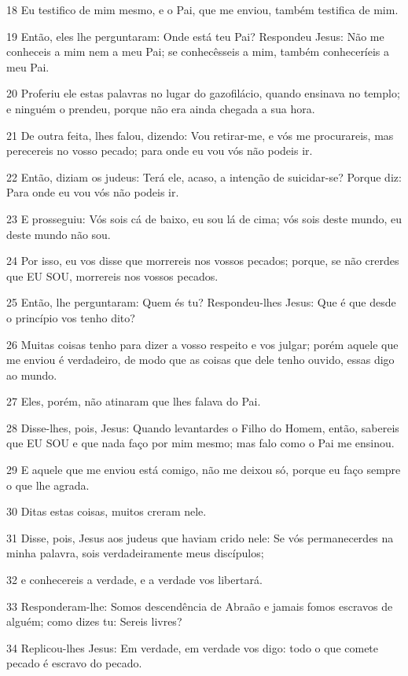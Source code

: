 \par 18 Eu testifico de mim mesmo, e o Pai, que me enviou, também testifica de mim.
\par 19 Então, eles lhe perguntaram: Onde está teu Pai? Respondeu Jesus: Não me conheceis a mim nem a meu Pai; se conhecêsseis a mim, também conheceríeis a meu Pai.
\par 20 Proferiu ele estas palavras no lugar do gazofilácio, quando ensinava no templo; e ninguém o prendeu, porque não era ainda chegada a sua hora.
\par 21 De outra feita, lhes falou, dizendo: Vou retirar-me, e vós me procurareis, mas perecereis no vosso pecado; para onde eu vou vós não podeis ir.
\par 22 Então, diziam os judeus: Terá ele, acaso, a intenção de suicidar-se? Porque diz: Para onde eu vou vós não podeis ir.
\par 23 E prosseguiu: Vós sois cá de baixo, eu sou lá de cima; vós sois deste mundo, eu deste mundo não sou.
\par 24 Por isso, eu vos disse que morrereis nos vossos pecados; porque, se não crerdes que EU SOU, morrereis nos vossos pecados.
\par 25 Então, lhe perguntaram: Quem és tu? Respondeu-lhes Jesus: Que é que desde o princípio vos tenho dito?
\par 26 Muitas coisas tenho para dizer a vosso respeito e vos julgar; porém aquele que me enviou é verdadeiro, de modo que as coisas que dele tenho ouvido, essas digo ao mundo.
\par 27 Eles, porém, não atinaram que lhes falava do Pai.
\par 28 Disse-lhes, pois, Jesus: Quando levantardes o Filho do Homem, então, sabereis que EU SOU e que nada faço por mim mesmo; mas falo como o Pai me ensinou.
\par 29 E aquele que me enviou está comigo, não me deixou só, porque eu faço sempre o que lhe agrada.
\par 30 Ditas estas coisas, muitos creram nele.
\par 31 Disse, pois, Jesus aos judeus que haviam crido nele: Se vós permanecerdes na minha palavra, sois verdadeiramente meus discípulos;
\par 32 e conhecereis a verdade, e a verdade vos libertará.
\par 33 Responderam-lhe: Somos descendência de Abraão e jamais fomos escravos de alguém; como dizes tu: Sereis livres?
\par 34 Replicou-lhes Jesus: Em verdade, em verdade vos digo: todo o que comete pecado é escravo do pecado.
